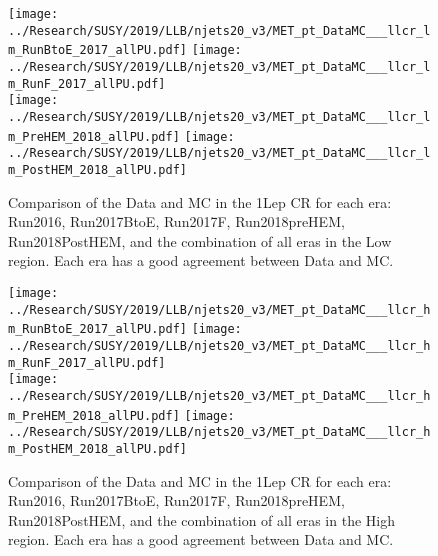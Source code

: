 \begin{figure}[!htb]
	\begin{center}
  \texttt{[image: ../Research/SUSY/2019/LLB/njets20\_v3/MET\_pt\_DataMC\_\_\_llcr\_lm\_RunBtoE\_2017\_allPU.pdf]}
  \texttt{[image: ../Research/SUSY/2019/LLB/njets20\_v3/MET\_pt\_DataMC\_\_\_llcr\_lm\_RunF\_2017\_allPU.pdf]} \\
  \texttt{[image: ../Research/SUSY/2019/LLB/njets20\_v3/MET\_pt\_DataMC\_\_\_llcr\_lm\_PreHEM\_2018\_allPU.pdf]}
  \texttt{[image: ../Research/SUSY/2019/LLB/njets20\_v3/MET\_pt\_DataMC\_\_\_llcr\_lm\_PostHEM\_2018\_allPU.pdf]} \\
	\end{center}
	\caption{Comparison of the Data and MC in the 1Lep CR for each era: Run2016, Run2017BtoE, Run2017F, Run2018preHEM, Run2018PostHEM, and the combination of all eras in the Low \dm{} region. Each era has a good agreement between Data and MC. 
	 }
	\label{fig:llb-1lcr-datavsmc-lm-inclusive}
\end{figure}
\begin{figure}[!htb]
	\begin{center}  
		\texttt{[image: ../Research/SUSY/2019/LLB/njets20\_v3/MET\_pt\_DataMC\_\_\_llcr\_hm\_RunBtoE\_2017\_allPU.pdf]}
		\texttt{[image: ../Research/SUSY/2019/LLB/njets20\_v3/MET\_pt\_DataMC\_\_\_llcr\_hm\_RunF\_2017\_allPU.pdf]} \\
		\texttt{[image: ../Research/SUSY/2019/LLB/njets20\_v3/MET\_pt\_DataMC\_\_\_llcr\_hm\_PreHEM\_2018\_allPU.pdf]}
		\texttt{[image: ../Research/SUSY/2019/LLB/njets20\_v3/MET\_pt\_DataMC\_\_\_llcr\_hm\_PostHEM\_2018\_allPU.pdf]}
	\end{center}
	\caption{Comparison of the Data and MC in the 1Lep CR for each era: Run2016, Run2017BtoE, Run2017F, Run2018preHEM, Run2018PostHEM, and the combination of all eras in the High \dm{} region. Each era has a good agreement between Data and MC. 
	 }
	\label{fig:llb-1lcr-datavsmc-hm-inclusive}
\end{figure}
